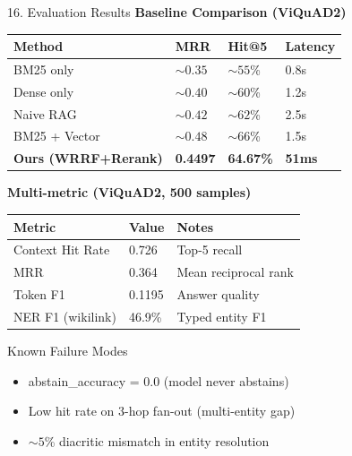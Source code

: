 \documentclass[aspectratio=169]{beamer}
\newcommand{\pos}[1]{\textcolor{positive}{#1}}
\begin{document}
\begin{frame}[shrink=8]{16. Evaluation Results}
\textbf{Baseline Comparison (ViQuAD2)}\\[4pt]
\begin{tabular}{@{}llll@{}}
\toprule
\textbf{Method} & \textbf{MRR} & \textbf{Hit@5} & \textbf{Latency} \\
\midrule
BM25 only                         & ${\sim}0.35$ & ${\sim}55$\%   & 0.8s \\
Dense only                        & ${\sim}0.40$ & ${\sim}60$\%   & 1.2s \\
Naive RAG                         & ${\sim}0.42$ & ${\sim}62$\%   & 2.5s \\
BM25 + Vector                     & ${\sim}0.48$ & ${\sim}66$\%   & 1.5s \\
\pos{\textbf{Ours (WRRF+Rerank)}} & \pos{\textbf{0.4497}} & \pos{\textbf{64.67\%}} & \pos{\textbf{51ms}} \\
\bottomrule
\end{tabular}

\vspace{6pt}
\textbf{Multi-metric (ViQuAD2, 500 samples)}\\[4pt]
\begin{tabular}{@{}lll@{}}
\toprule
\textbf{Metric} & \textbf{Value} & \textbf{Notes} \\
\midrule
Context Hit Rate  & 0.726   & Top-5 recall \\
MRR               & 0.364   & Mean reciprocal rank \\
Token F1          & 0.1195  & Answer quality \\
NER F1 (wikilink) & 46.9\%  & Typed entity F1 \\
\bottomrule
\end{tabular}

\begin{alertblock}{Known Failure Modes}
\begin{itemize}\scriptsize\setlength\itemsep{1pt}
  \item abstain\_accuracy = 0.0 (model never abstains)
  \item Low hit rate on 3-hop fan-out (multi-entity gap)
  \item ${\sim}5$\% diacritic mismatch in entity resolution
\end{itemize}
\end{alertblock}
\end{frame}
\end{document}
